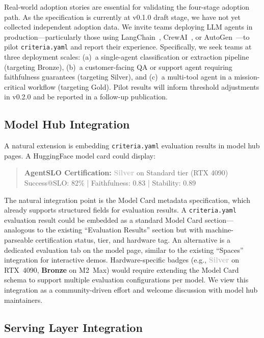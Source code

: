 \documentclass[11pt]{article}
\newcommand{\criteriayaml}{\texttt{criteria.yaml}}
\begin{document}
Real-world adoption stories are essential for validating the four-stage adoption path. As the specification is currently at v0.1.0 draft stage, we have not yet collected independent adoption data. We invite teams deploying LLM agents in production---particularly those using LangChain~\citep{langchain2023}, CrewAI~\citep{crewai2024}, or AutoGen~\citep{autogen2023}---to pilot \criteriayaml{} and report their experience. Specifically, we seek teams at three deployment scales: (a)~a single-agent classification or extraction pipeline (targeting Bronze), (b)~a customer-facing QA or support agent requiring faithfulness guarantees (targeting Silver), and (c)~a multi-tool agent in a mission-critical workflow (targeting Gold). Pilot results will inform threshold adjustments in v0.2.0 and be reported in a follow-up publication.

\subsection{Model Hub Integration}

A natural extension is embedding \criteriayaml{} evaluation results in model hub pages. A HuggingFace model card could display:

\begin{quote}
\textbf{AgentSLO Certification:} \textcolor{silver}{\textbf{Silver}} on Standard tier (RTX 4090) \\
Success@SLO: 82\% | Faithfulness: 0.83 | Stability: 0.89
\end{quote}

The natural integration point is the Model Card metadata specification, which already supports structured fields for evaluation results. A \criteriayaml{} evaluation result could be embedded as a standard Model Card section---analogous to the existing ``Evaluation Results'' section but with machine-parseable certification status, tier, and hardware tag. An alternative is a dedicated evaluation tab on the model page, similar to the existing ``Spaces'' integration for interactive demos. Hardware-specific badges (e.g., \textcolor{silver}{\textbf{Silver}} on RTX~4090, \textcolor{bronze}{\textbf{Bronze}} on M2~Max) would require extending the Model Card schema to support multiple evaluation configurations per model. We view this integration as a community-driven effort and welcome discussion with model hub maintainers.

\subsection{Serving Layer Integration}
\end{document}
